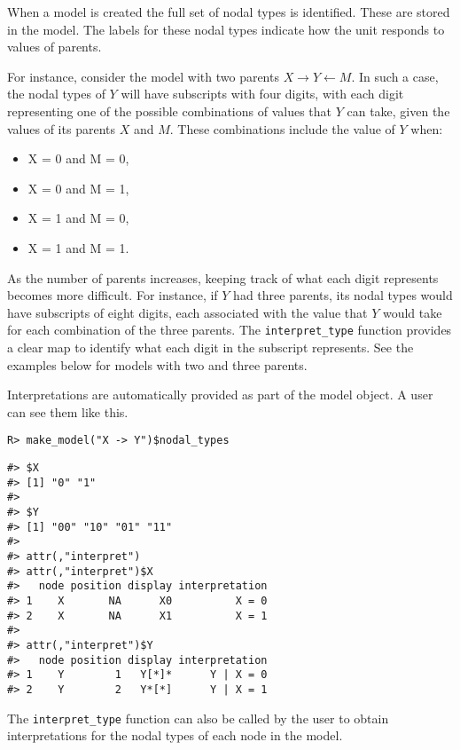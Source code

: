 \documentclass[
  11pt,
  article]{jss}
\providecommand{\tightlist}{%
  \setlength{\itemsep}{0pt}\setlength{\parskip}{0pt}}\usepackage{longtable,booktabs,array}
\begin{document}
When a model is created the full set of nodal types is identified. These
are stored in the model. The labels for these nodal types indicate how
the unit responds to values of parents.

For instance, consider the model with two parents
\(X \rightarrow Y \leftarrow M.\) In such a case, the nodal types of
\(Y\) will have subscripts with four digits, with each digit
representing one of the possible combinations of values that \(Y\) can
take, given the values of its parents \(X\) and \(M.\) These
combinations include the value of \(Y\) when:

\begin{itemize}
\tightlist
\item
  X = 0 and M = 0,
\item
  X = 0 and M = 1,
\item
  X = 1 and M = 0,
\item
  X = 1 and M = 1.
\end{itemize}

As the number of parents increases, keeping track of what each digit
represents becomes more difficult. For instance, if \(Y\) had three
parents, its nodal types would have subscripts of eight digits, each
associated with the value that \(Y\) would take for each combination of
the three parents. The \texttt{interpret\_type} function provides a
clear map to identify what each digit in the subscript represents. See
the examples below for models with two and three parents.

Interpretations are automatically provided as part of the model object.
A user can see them like this.

\begin{verbatim}
R> make_model("X -> Y")$nodal_types
\end{verbatim}

\begin{verbatim}
#> $X
#> [1] "0" "1"
#> 
#> $Y
#> [1] "00" "10" "01" "11"
#> 
#> attr(,"interpret")
#> attr(,"interpret")$X
#>   node position display interpretation
#> 1    X       NA      X0          X = 0
#> 2    X       NA      X1          X = 1
#> 
#> attr(,"interpret")$Y
#>   node position display interpretation
#> 1    Y        1   Y[*]*      Y | X = 0
#> 2    Y        2   Y*[*]      Y | X = 1
\end{verbatim}

The \texttt{interpret\_type} function can also be called by the user to
obtain interpretations for the nodal types of each node in the model.
\end{document}

